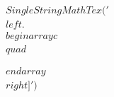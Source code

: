 \documentclass[preview]{standalone}
\begin{document}
\begin{align*}
SingleStringMathTex('\\left.\\begin{array}{c}\\quad \\\\\\end{array}\\right]')
\end{align*}
\end{document}
